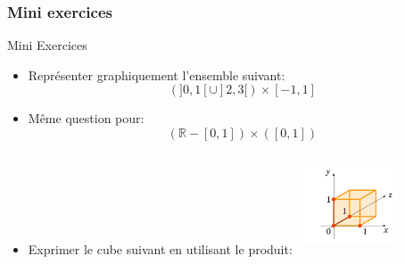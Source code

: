 \documentclass{beamer}
\begin{document}
\begin{frame}[<+->]
  \frametitle{Mini exercices }
 \begin{block}{Mini Exercices}
   \begin{itemize}
     \item Représenter graphiquement l'ensemble suivant:
       \begin{equation}
         \left(]0,1[\cup ]2,3[\right)\times [-1,1]
       \end{equation}
     \item Même question pour:
       \begin{equation}
       \left(\mathbb{R}- [0,1]\right)\times \left([0,1]\right)
       \end{equation}
     \item Exprimer le cube suivant en utilisant le produit:
         \centering
         \includegraphics[width=3cm, height=3cm]{./cube.png}
   \end{itemize} 
 \end{block} 
\end{frame}
\end{document}
